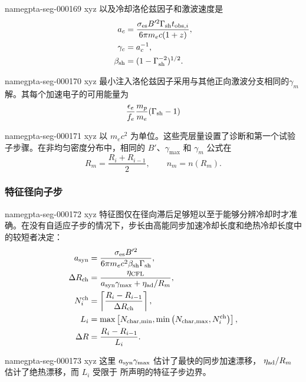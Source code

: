 \documentclass[twocolumn]{aastex702}
\makeatletter
\providecommand{\gptareaderanchor}[1]{\pdfdest name{#1} xyz}%
\providecommand{\gptareaderanchor}[1]{\special{pdf:dest (#1) [ @thispage /XYZ @xpos @ypos null ]}}%
\makeatother
\begin{document}
\gptareaderanchor{gpta-seg-000169}%
以及冷却洛伦兹因子和激波速度是
\begin{equation}
\begin{aligned}
a_c&=\frac{\sigma_{\rm es}B'^2\Gamma_{\rm sh}t_{{\rm obs},i}}
{6\pi m_ec(1+z)},\\
\gamma_c&=a_c^{-1},\\
\beta_{\rm sh}&=(1-\Gamma_{\rm sh}^{-2})^{1/2}.
\end{aligned}
\end{equation}

\gptareaderanchor{gpta-seg-000170}%
最小注入洛伦兹因子采用与其他正向激波分支相同的\(\gamma_m\)解。其每个加速电子的可用能量为
\begin{equation}
\frac{\epsilon_e}{f_e}\frac{m_p}{m_e}(\Gamma_{\rm sh}-1)
\end{equation}

\gptareaderanchor{gpta-seg-000171}%
以 \(m_ec^2\) 为单位。这些壳层量设置了诊断和第一个试验子步骤。在非均匀密度分布中，相同的 \(B'\)、\(\gamma_{\max}\) 和 \(\gamma_m\) 公式在
\begin{equation}
R_m=\frac{R_i+R_{i-1}}{2},
\qquad n_m=n(R_m) .
\end{equation}

\subsubsection{特征径向子步}


\gptareaderanchor{gpta-seg-000172}%
特征图仅在径向滞后足够短以至于能够分辨冷却时才准确。在没有自适应子步的情况下，步长由高能同步加速冷却长度和绝热冷却长度中的较短者决定：
\begin{equation}
\begin{aligned}
a_{\rm syn}&=\frac{\sigma_{\rm es}B'^2}{6\pi m_ec^2\beta_{\rm sh}\Gamma_{\rm sh}},\\
\Delta R_{\rm ch}&=\frac{\eta_{\rm CFL}}
{a_{\rm syn}\gamma_{\max}+\eta_{\rm ad}/R_m},\\
N_i^{\rm ch}&=\left\lceil\frac{R_i-R_{i-1}}{\Delta R_{\rm ch}}\right\rceil,\\
L_i&=\max\left[
N_{\rm char,min},
\min\left(N_{\rm char,max},N_i^{\rm ch}\right)
\right],\\
\Delta R&=\frac{R_i-R_{i-1}}{L_i}.
\end{aligned}
\end{equation}

\gptareaderanchor{gpta-seg-000173}%
这里 \(a_{\rm syn}\gamma_{\max}\) 估计了最快的同步加速漂移，
\(\eta_{\rm ad}/R_m\) 估计了绝热漂移，而 \(L_i\) 受限于
所声明的特征子步边界。
\end{document}
